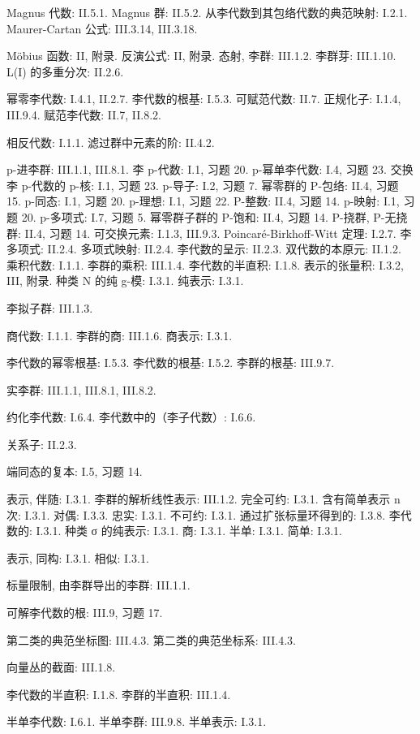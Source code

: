 Magnus 代数: II.5.1. Magnus 群: II.5.2. 从李代数到其包络代数的典范映射: I.2.1. Maurer-Cartan 公式: III.3.14, III.3.18.

Möbius 函数: II, 附录. 反演公式: II, 附录. 态射, 李群: III.1.2. 李群芽: III.1.10. L(I) 的多重分次: II.2.6.

幂零李代数: I.4.1, II.2.7. 李代数的根基: I.5.3. 可赋范代数: II.7. 正规化子: I.1.4, III.9.4. 赋范李代数: II.7, II.8.2.

相反代数: I.1.1. 滤过群中元素的阶: II.4.2.

p-进李群: III.1.1, III.8.1. 李 p-代数: I.1, 习题 20. p-幂单李代数: I.4, 习题 23. 交换李 p-代数的 p-核: I.1, 习题 23. p-导子: I.2, 习题 7. 幂零群的 P-包络: II.4, 习题 15. p-同态: I.1, 习题 20. p-理想: I.1, 习题 22. P-整数: II.4, 习题 14. p-映射: I.1, 习题 20. p-多项式: I.7, 习题 5. 幂零群子群的 P-饱和: II.4, 习题 14. P-挠群, P-无挠群: II.4, 习题 14. 可交换元素: I.1.3, III.9.3. Poincaré-Birkhoff-Witt 定理: I.2.7. 李多项式: II.2.4. 多项式映射: II.2.4. 李代数的呈示: II.2.3. 双代数的本原元: II.1.2. 乘积代数: I.1.1. 李群的乘积: III.1.4. 李代数的半直积: I.1.8. 表示的张量积: I.3.2, III, 附录. 种类 N 的纯 g-模: I.3.1. 纯表示: I.3.1.

李拟子群: III.1.3.

商代数: I.1.1. 李群的商: III.1.6. 商表示: I.3.1.

李代数的幂零根基: I.5.3. 李代数的根基: I.5.2. 李群的根基: III.9.7.

实李群: III.1.1, III.8.1, III.8.2.

约化李代数: I.6.4. 李代数中的（李子代数）: I.6.6.

关系子: II.2.3.

端同态的复本: I.5, 习题 14.

表示, 伴随: I.3.1. 李群的解析线性表示: III.1.2. 完全可约: I.3.1. 含有简单表示 n 次: I.3.1. 对偶: I.3.3. 忠实: I.3.1. 不可约: I.3.1. 通过扩张标量环得到的: I.3.8. 李代数的: I.3.1. 种类 σ 的纯表示: I.3.1. 商: I.3.1. 半单: I.3.1. 简单: I.3.1.

表示, 同构: I.3.1. 相似: I.3.1.

标量限制, 由李群导出的李群: III.1.1.

可解李代数的根: III.9, 习题 17.

第二类的典范坐标图: III.4.3. 第二类的典范坐标系: III.4.3.

向量丛的截面: III.1.8.

李代数的半直积: I.1.8. 李群的半直积: III.1.4.

半单李代数: I.6.1. 半单李群: III.9.8. 半单表示: I.3.1.

